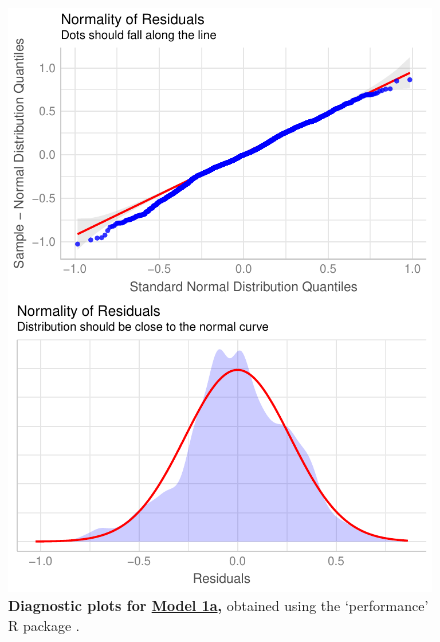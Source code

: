 \begin{figure}[h!]
\centering
\includegraphics[scale=0.7]{Supporting/Chapter3/Figures/Diagnostics/SI_diagnostics_Model1a}
\caption[Diagnostic plots for Model 1a]{\textbf{Diagnostic plots for \underline{Model 1a},} obtained using the `performance' R package \citep{performance}.}
\label{SI3_F9}
\end{figure}

\newpage

